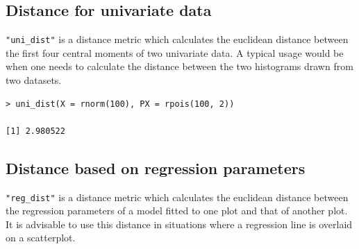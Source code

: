 \documentclass[article]{jss}
\begin{document}
\subsection{Distance for univariate
data}\label{distance-for-univariate-data}

\texttt{"uni\_dist"} is a distance metric which calculates the euclidean
distance between the first four central moments of two univariate data.
A typical usage would be when one needs to calculate the distance
between the two histograms drawn from two datasets.

%

\begin{verbatim}
> uni_dist(X = rnorm(100), PX = rpois(100, 2))

[1] 2.980522
\end{verbatim}

\subsection{Distance based on regression
parameters}\label{distance-based-on-regression-parameters}

\texttt{"reg\_dist"} is a distance metric which calculates the euclidean
distance between the regression parameters of a model fitted to one plot
and that of another plot. It is advisable to use this distance in
situations where a regression line is overlaid on a scatterplot.

%
\end{document}
